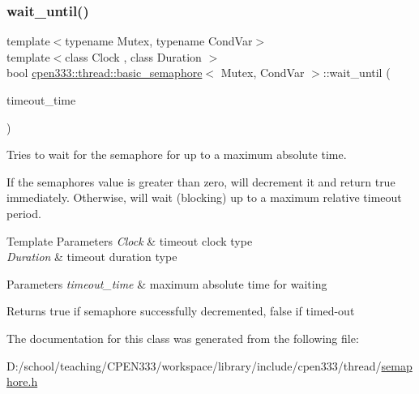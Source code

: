 \subsubsection{\texorpdfstring{wait\+\_\+until()}{wait\_until()}}
{\footnotesize\ttfamily template$<$typename Mutex, typename Cond\+Var$>$ \\
template$<$class Clock , class Duration $>$ \\
bool \hyperlink{classcpen333_1_1thread_1_1basic__semaphore}{cpen333\+::thread\+::basic\+\_\+semaphore}$<$ Mutex, Cond\+Var $>$\+::wait\+\_\+until (\begin{DoxyParamCaption}\item[{const std\+::chrono\+::time\+\_\+point$<$ Clock, Duration $>$ \&}]{timeout\+\_\+time }\end{DoxyParamCaption})\hspace{0.3cm}{\ttfamily [inline]}}



Tries to wait for the semaphore for up to a maximum absolute time. 

If the semaphore\textquotesingle{}s value is greater than zero, will decrement it and return true immediately. Otherwise, will wait (blocking) up to a maximum relative timeout period.


\begin{DoxyTemplParams}{Template Parameters}
{\em Clock} & timeout clock type \\
\hline
{\em Duration} & timeout duration type \\
\hline
\end{DoxyTemplParams}

\begin{DoxyParams}{Parameters}
{\em timeout\+\_\+time} & maximum absolute time for waiting \\
\hline
\end{DoxyParams}
\begin{DoxyReturn}{Returns}
true if semaphore successfully decremented, false if timed-\/out 
\end{DoxyReturn}


The documentation for this class was generated from the following file\+:\begin{DoxyCompactItemize}
\item 
D\+:/school/teaching/\+C\+P\+E\+N333/workspace/library/include/cpen333/thread/\hyperlink{thread_2semaphore_8h}{semaphore.\+h}\end{DoxyCompactItemize}
